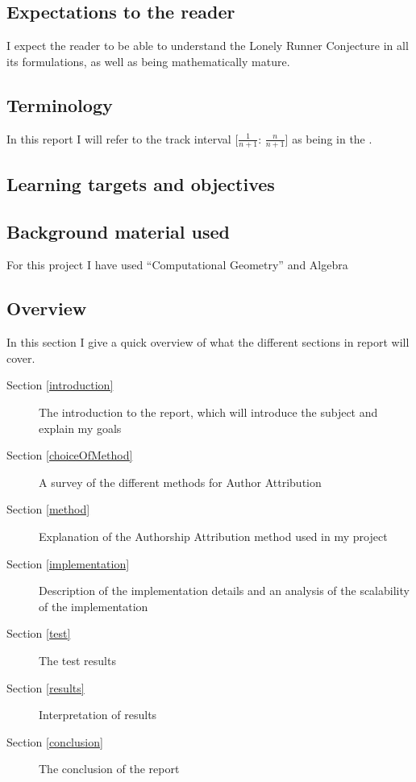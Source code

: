 \subsection{Expectations to the reader}
\label{expectations}
I expect the reader to be able to understand the Lonely Runner Conjecture in all its formulations, as well as being mathematically mature.

\subsection{Terminology}
\label{Termonolgy}
In this report I will refer to the track interval [$\frac{1}{n + 1}$: $\frac{n}{n+1}$] as being in the \zone.

\subsection{Learning targets and objectives}
\label{learning}

\subsection{Background material used}
\label{background}
For this project I have used ``Computational Geometry'' \cite{citeulike:3347056} and Algebra  

\subsection{Overview}

In this section I give a quick overview of what the different sections in report will cover.
\begin{description}
\item[Section \ref{introduction}] The introduction to the report, which will introduce the subject and explain my goals
\item[Section \ref{choiceOfMethod}] A survey of the different methods for Author Attribution  
\item[Section \ref{method}] Explanation of the Authorship Attribution method used in my project
\item[Section \ref{implementation}] Description of the implementation details and an analysis of the scalability of the implementation
\item[Section \ref{test}] The test results
\item[Section \ref{results}] Interpretation of results
\item[Section \ref{conclusion}] The conclusion of the report  
\end{description}
